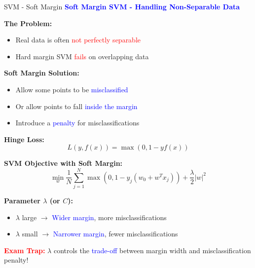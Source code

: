 \documentclass[8pt]{beamer}
\begin{document}
	\begin{frame}{SVM - Soft Margin}
		\fontsize{6.5}{7.5}\selectfont
		\textcolor{blue}{\textbf{Soft Margin SVM - Handling Non-Separable Data}}
		
		\textbf{The Problem:}
		\begin{itemize}
			\item Real data is often \textcolor{red}{not perfectly separable}
			\item Hard margin SVM \textcolor{red}{fails} on overlapping data
		\end{itemize}
		
		\textbf{Soft Margin Solution:}
		\begin{itemize}
			\item Allow some points to be \textcolor{blue}{misclassified}
			\item Or allow points to fall \textcolor{blue}{inside the margin}
			\item Introduce a \textcolor{blue}{penalty} for misclassifications
		\end{itemize}
		
		\textbf{Hinge Loss:}
		\[
		L(y, f(x)) = \max(0, 1 - y f(x))
		\]
		
		\textbf{SVM Objective with Soft Margin:}
		\[
		\min_{w} \frac{1}{N}\sum_{j=1}^N \max(0, 1 - y_j(w_0 + w^T x_j)) + \frac{\lambda}{2}|w|^2
		\]
		
		\textbf{Parameter $\lambda$ (or $C$):}
		\begin{itemize}
			\item $\lambda$ large $\rightarrow$ \textcolor{blue}{Wider margin}, more misclassifications
			\item $\lambda$ small $\rightarrow$ \textcolor{blue}{Narrower margin}, fewer misclassifications
		\end{itemize}
		
		\textcolor{red}{\textbf{Exam Trap:}} $\lambda$ controls the \textcolor{blue}{trade-off} between margin width and misclassification penalty!
	\end{frame}
	
\end{document}
